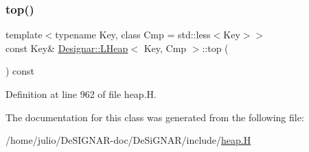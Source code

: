 \subsubsection{\texorpdfstring{top()}{top()}}
{\footnotesize\ttfamily template$<$typename Key, class Cmp = std\+::less$<$\+Key$>$$>$ \\
const Key\& \hyperlink{class_designar_1_1_l_heap}{Designar\+::\+L\+Heap}$<$ Key, Cmp $>$\+::top (\begin{DoxyParamCaption}{ }\end{DoxyParamCaption}) const\hspace{0.3cm}{\ttfamily [inline]}}



Definition at line 962 of file heap.\+H.



The documentation for this class was generated from the following file\+:\begin{DoxyCompactItemize}
\item 
/home/julio/\+De\+S\+I\+G\+N\+A\+R-\/doc/\+De\+Si\+G\+N\+A\+R/include/\hyperlink{heap_8_h}{heap.\+H}\end{DoxyCompactItemize}
